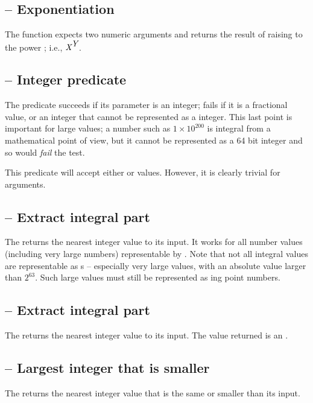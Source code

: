 \subsection{\function{**} -- Exponentiation}
The \function{**} function expects two numeric arguments and returns the result of raising  to the power ; i.e., ${\mbox{\rm\em X}}^{\mbox{\rm\em Y}}$.

\subsection{ -- Integer predicate}
The  predicate succeeds if its parameter is an integer; fails if it is a fractional value, or an integer that cannot be represented as a integer. This last point is important for large values; a number such as $1\times10^{200}$ is integral from a mathematical point of view, but it cannot be represented as a 64 bit integer and so would \emph{fail} the  test.

This predicate will accept either  or  values. However, it is clearly trivial for  arguments.

\subsection{ -- Extract integral part}
The  returns the nearest integer value to its input. It works for all number values (including very large numbers) representable by \go. Note that not all integral values are representable as s -- especially very large values, with an absolute value larger than $2^{63}$. Such large values must still be represented as ing point numbers.

\subsection{ -- Extract integral part}
\label{arith:itrunc}
The  returns the nearest integer value to its input. The value returned is an .

\subsection{ -- Largest integer that is smaller}
The  returns the nearest integer value that is the same or smaller than its input.

